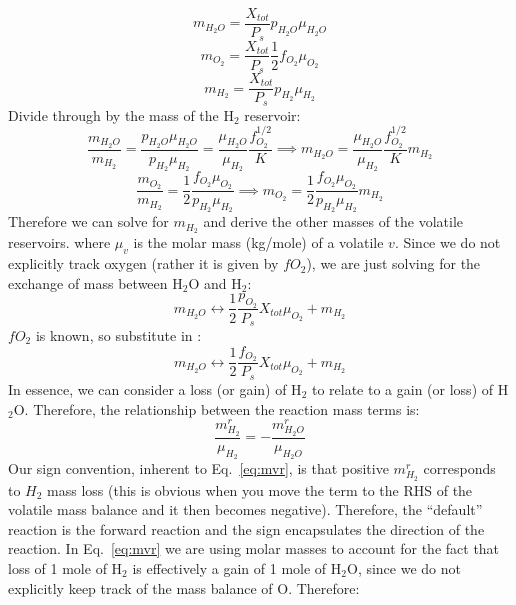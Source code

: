 \begin{equation}
m_{H_2O} = \frac{X_{tot}}{P_s} p_{H_2O} \mu_{H_2O}
\end{equation}
\begin{equation}
m_{O_2} = \frac{X_{tot}}{P_s} \frac{1}{2} f_{O_2} \mu_{O_2}
\end{equation}
\begin{equation}
m_{H_2} = \frac{X_{tot}}{P_s} p_{H_2} \mu_{H_2}
\end{equation}
Divide through by the mass of the H$_2$ reservoir:
\begin{equation}
\frac{m_{H_2O}}{m_{H_2}} = \frac{p_{H_2O} \mu_{H_2O}}{p_{H_2} \mu_{H_2} } = \frac{\mu_{H_2O}}{\mu_{H_2}} \frac{f_{O_2}^{1/2}}{K} \implies m_{H_2O} = \frac{\mu_{H_2O}}{\mu_{H_2}} \frac{f_{O_2}^{1/2}}{K} m_{H_2}
\end{equation}
\begin{equation}
\frac{m_{O_2}}{m_{H_2}} = \frac{1}{2} \frac{ f_{O_2} \mu_{O_2}}{p_{H_2} \mu_{H_2}} \implies m_{O_2} = \frac{1}{2} \frac{ f_{O_2} \mu_{O_2}}{p_{H_2} \mu_{H_2}} m_{H_2}
\end{equation}
Therefore we can solve for $m_{H_2}$ and derive the other masses of the volatile reservoirs.
where $\mu_v$ is the molar mass (kg/mole) of a volatile $v$.  Since we do not explicitly track oxygen (rather it is given by $fO_2$), we are just solving for the exchange of mass between H$_2$O and H$_2$:
\begin{equation}
m_{H_2O} \leftrightarrow \frac{1}{2} \frac{p_{O_2}}{P_s} X_{tot} \mu_{O_2} + m_{H_2}
\end{equation}
$fO_2$ is known, so substitute in :
\begin{equation}
m_{H_2O} \leftrightarrow \frac{1}{2} \frac{f_{O_2}}{P_s} X_{tot} \mu_{O_2} + m_{H_2}
\end{equation}
In essence, we can consider a loss (or gain) of H$_2$ to relate to a gain (or loss) of H$_2$O.  Therefore, the relationship between the reaction mass terms is:
\begin{equation}
\frac{m_{H_2}^r}{\mu_{H_2}} = -\frac{m_{H_2O}^r}{\mu_{H_2O}}
\label{eq:mvr}
\end{equation}
Our sign convention, inherent to Eq.~\ref{eq:mvr}, is that positive $m_{H_2}^r$ corresponds to $H_2$ mass loss (this is obvious when you move the term to the RHS of the volatile mass balance and it then becomes negative).  Therefore, the ``default'' reaction is the forward reaction and the sign encapsulates the direction of the reaction.  In Eq.~\ref{eq:mvr} we are using molar masses to account for the fact that loss of 1 mole of H$_2$ is effectively a gain of 1 mole of H$_2$O, since we do not explicitly keep track of the mass balance of O.  Therefore:
